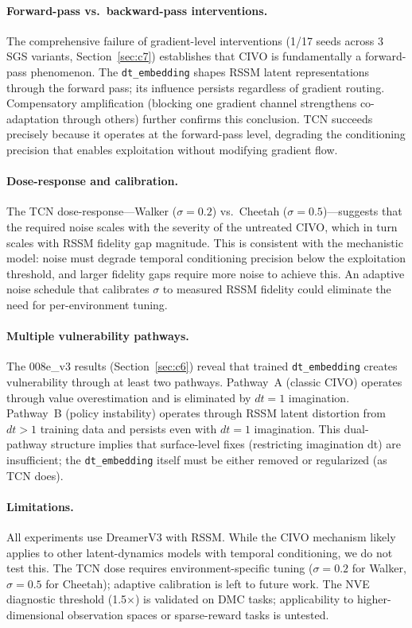 \documentclass[10pt,letterpaper]{article}
\begin{document}
\paragraph{Forward-pass vs.\ backward-pass interventions.}
The comprehensive failure of gradient-level interventions (1/17 seeds across 3 SGS variants, Section~\ref{sec:c7}) establishes that CIVO is fundamentally a forward-pass phenomenon.
The \texttt{dt\_embedding} shapes RSSM latent representations through the forward pass; its influence persists regardless of gradient routing.
Compensatory amplification (blocking one gradient channel strengthens co-adaptation through others) further confirms this conclusion.
TCN succeeds precisely because it operates at the forward-pass level, degrading the conditioning precision that enables exploitation without modifying gradient flow.

\paragraph{Dose-response and calibration.}
The TCN dose-response---Walker ($\sigma=0.2$) vs.\ Cheetah ($\sigma=0.5$)---suggests that the required noise scales with the severity of the untreated CIVO, which in turn scales with RSSM fidelity gap magnitude.
This is consistent with the mechanistic model: noise must degrade temporal conditioning precision below the exploitation threshold, and larger fidelity gaps require more noise to achieve this.
An adaptive noise schedule that calibrates $\sigma$ to measured RSSM fidelity could eliminate the need for per-environment tuning.

\paragraph{Multiple vulnerability pathways.}
The 008e\_v3 results (Section~\ref{sec:c6}) reveal that trained \texttt{dt\_embedding} creates vulnerability through at least two pathways.
Pathway~A (classic CIVO) operates through value overestimation and is eliminated by $dt=1$ imagination.
Pathway~B (policy instability) operates through RSSM latent distortion from $dt>1$ training data and persists even with $dt=1$ imagination.
This dual-pathway structure implies that surface-level fixes (restricting imagination dt) are insufficient; the \texttt{dt\_embedding} itself must be either removed or regularized (as TCN does).

\paragraph{Limitations.}
All experiments use DreamerV3 with RSSM.
While the CIVO mechanism likely applies to other latent-dynamics models with temporal conditioning, we do not test this.
The TCN dose requires environment-specific tuning ($\sigma=0.2$ for Walker, $\sigma=0.5$ for Cheetah); adaptive calibration is left to future work.
The NVE diagnostic threshold (1.5$\times$) is validated on DMC tasks; applicability to higher-dimensional observation spaces or sparse-reward tasks is untested.
\end{document}
